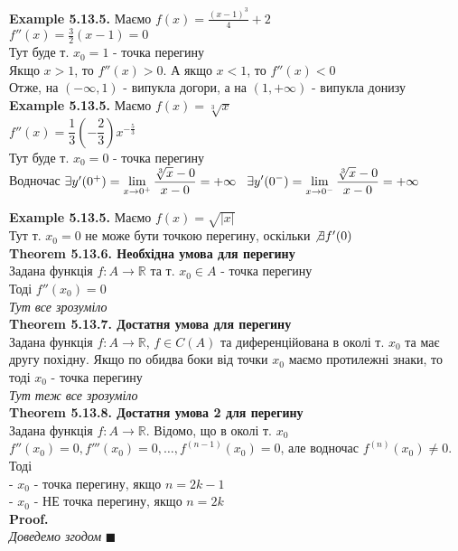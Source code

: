 \documentclass[a4paper, 14pt]{extarticle}
\def\huge{\displaystyle}
\def\bigline{\vspace{5mm}\\}
\def\ex#1{\textbf{Example {#1}}}
\def\th#1{\textbf{Theorem {#1}}}
\def\proof{\textbf{Proof.}\\}
\def\bigline{\vspace{5mm}\\}
\def\qed{$\blacksquare$}
\begin{document}
\ex{5.13.5.} Маємо $f(x) = \huge \frac{(x-1)^3}{4} + 2$\\
$f''(x) = \huge \frac{3}{2}(x-1) = 0$\\
Тут буде т. $x_0 = 1$ - точка перегину\\
Якщо $x > 1$, то $f''(x) > 0$. А якщо $x < 1$, то $f''(x) < 0$\\
Отже, на $(-\infty,1)$ - випукла догори, а на $(1,+\infty)$ - випукла донизу
\bigline
\ex{5.13.5.} Маємо $f(x) = \sqrt[3]{x}$\\
$f''(x) = \dfrac{1}{3} \left( -\dfrac{2}{3} \right) x^{-\frac{5}{3}}$\\
Тут буде т. $x_0 = 0$ - точка перегину\\
Водночас $\exists y'(0^+) = \huge \lim_{x \to 0^+} \dfrac{\sqrt[3]{x} - 0}{x - 0} = +\infty \hspace{0.3cm} \exists y'(0^-) = \huge \lim_{x \to 0^-} \dfrac{\sqrt[3]{x} - 0}{x - 0} = +\infty$
\begin{figure}[H]
\centering
{}
\end{figure}

\ex{5.13.5.} Маємо $f(x) = \sqrt{|x|}$\\
Тут т. $x_0 = 0$ не може бути точкою перегину, оскільки $\not \exists f'(0)$
\bigline
\th{5.13.6. Необхідна умова для перегину}\\
Задана функція $f: A \to \mathbb{R}$ та т. $x_0 \in A$ - точка перегину\\
Тоді $f''(x_0) = 0$\\
\textit{Тут все зрозуміло}
\bigline
\th{5.13.7. Достатня умова для перегину}\\
Задана функція $f: A \to \mathbb{R}$, $f \in C(A)$ та диференційована в околі т. $x_0$ та має другу похідну. Якщо по обидва боки від точки $x_0$ маємо протилежні знаки, то тоді $x_0$ - точка перегину\\
\textit{Тут теж все зрозуміло}
\bigline
\th{5.13.8. Достатня умова 2 для перегину}\\
Задана функція $f: A \to \mathbb{R}$. Відомо, що в околі т. $x_0$\\
$f''(x_0) = 0, f'''(x_0) = 0, \dots, f^{(n-1)}(x_0) = 0$, але водночас $f^{(n)}(x_0) \neq 0$. Тоді\\
- $x_0$ - точка перегину, якщо $n = 2k-1$\\
- $x_0$ - НЕ точка перегину, якщо $n = 2k$\\
\proof
\textit{Доведемо згодом} \qed
\bigline
\end{document}
